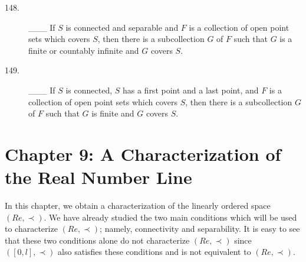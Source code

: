 \documentclass{book}
\begin{document}
\begin{description}
\item[148.] \_\_\_ If $S$ is connected and separable and $F$ is a collection of open point sets which covers $S$, then there is a subcollection $G$ of $F$ such that $G$ is a finite or countably infinite and $G$ covers $S$.

\item[149.] \_\_\_ If $S$ is connected, $S$ has a first point and a last point, and $F$ is a collection of open point sets which covers $S$, then there is a subcollection $G$ of $F$ such that $G$ is finite and $G$ covers $S$.


\end{description}




\chapter*{Chapter 9: A Characterization of the Real Number Line}


In this chapter, we obtain a characterization of the linearly ordered space $(Re, \prec)$. We have already studied the two main conditions which will be used to characterize $(Re, \prec)$; namely, connectivity and separability. It is easy to see that these two conditions alone do not characterize $(Re, \prec)$ since $([0,l], \prec)$ also satisfies these conditions and is not equivalent to $(Re, \prec)$.
\end{document}
